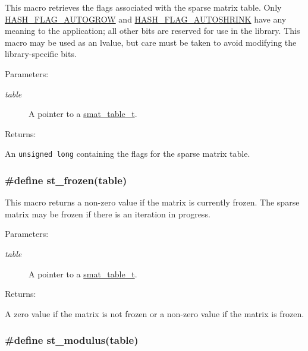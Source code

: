 This macro retrieves the flags associated with the sparse matrix table. Only \hyperlink{group__dbprim__hash_a16}{HASH\_\-FLAG\_\-AUTOGROW} and \hyperlink{group__dbprim__hash_a17}{HASH\_\-FLAG\_\-AUTOSHRINK} have any meaning to the application; all other bits are reserved for use in the library. This macro may be used as an lvalue, but care must be taken to avoid modifying the library-specific bits.\begin{Desc}
\item[Parameters: ]\par
\begin{description}
\item[{\em 
table}]A pointer to a \hyperlink{group__dbprim__smat_a0}{smat\_\-table\_\-t}.\end{description}
\end{Desc}
\begin{Desc}
\item[Returns: ]\par
An {\tt unsigned long} containing the flags for the sparse matrix table. \end{Desc}
\hypertarget{group__dbprim__smat_a24}{
\subsubsection[st\_\-frozen]{\setlength{\rightskip}{0pt plus 5cm}\#define st\_\-frozen(table)}}
\label{group__dbprim__smat_a24}


This macro returns a non-zero value if the matrix is currently frozen. The sparse matrix may be frozen if there is an iteration in progress.\begin{Desc}
\item[Parameters: ]\par
\begin{description}
\item[{\em 
table}]A pointer to a \hyperlink{group__dbprim__smat_a0}{smat\_\-table\_\-t}.\end{description}
\end{Desc}
\begin{Desc}
\item[Returns: ]\par
A zero value if the matrix is not frozen or a non-zero value if the matrix is frozen. \end{Desc}
\hypertarget{group__dbprim__smat_a25}{
\subsubsection[st\_\-modulus]{\setlength{\rightskip}{0pt plus 5cm}\#define st\_\-modulus(table)}}
\label{group__dbprim__smat_a25}



